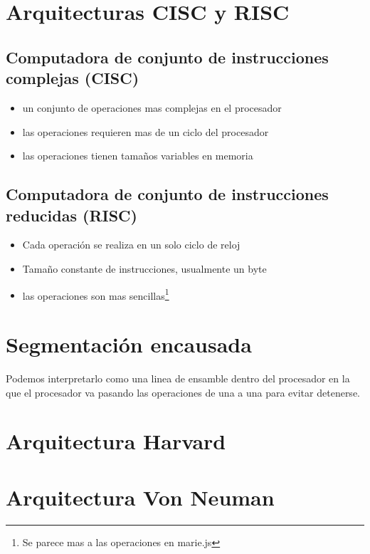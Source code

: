 \documentclass[12pt]{article}
\begin{document}
\section*{Arquitecturas CISC y RISC}
\label{sec:orgb6cca51}
\subsection*{Computadora de conjunto de instrucciones complejas (CISC)}
\label{sec:orgd83a5b4}
\begin{itemize}
\item un conjunto de operaciones mas complejas en el procesador
\item las operaciones requieren mas de un ciclo del procesador
\item las operaciones tienen tamaños variables en memoria
\end{itemize}

\subsection*{Computadora de conjunto de instrucciones reducidas (RISC)}
\label{sec:orgca7c172}
\begin{itemize}
\item Cada operación se realiza en un solo ciclo de reloj
\item Tamaño constante de instrucciones, usualmente un byte
\item las operaciones son mas sencillas\footnote{Se parece mas a las operaciones en marie.js}
\end{itemize}

\section*{Segmentación encausada}
\label{sec:org307d8fe}
Podemos interpretarlo como una linea de ensamble dentro del procesador en la que el procesador va pasando las operaciones de una a una para evitar detenerse. 

\section*{Arquitectura Harvard}
\label{sec:org6541e61}


\section*{Arquitectura Von Neuman}
\label{sec:orgdfa73b5}
\end{document}
